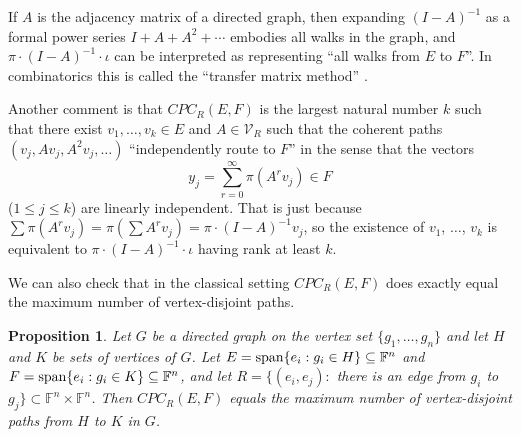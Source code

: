 \documentclass{amsart}
\newtheorem{prop}[thm]{Proposition}
\theoremstyle{definition}
\begin{document}
If $A$ is the adjacency matrix of a directed graph, then expanding $(I - A)^{-1}$ as a formal power series $I + A + A^2 + \cdots$ embodies all walks in the graph, and $\pi\cdot(I - A)^{-1}\cdot \iota$ can be interpreted as representing ``all walks from $E$ to $F$''. In combinatorics this is called the ``transfer matrix method'' \cite{stanley}.

Another comment is that $CPC_R(E,F)$ is the largest natural number $k$ such that there exist $v_1, \ldots, v_k \in E$ and $A \in \mathcal{V}_R$ such that the coherent paths $(v_j, Av_j, A^2 v_j, \ldots)$ ``independently route to $F$'' in the sense that the vectors $$y_j = \sum_{r = 0}^\infty \pi(A^r v_j) \in F$$ ($1 \leq j \leq k$) are linearly independent. That is just because $\sum \pi(A^r v_j) = \pi(\sum A^r v_j) = \pi\cdot(I - A)^{-1}v_j$, so the existence of $v_1$, $\ldots$, $v_k$ is equivalent to $\pi\cdot (I - A)^{-1}\cdot \iota$ having rank at least $k$.

We can also check that in the classical setting $CPC_R(E,F)$ does exactly equal the maximum number of vertex-disjoint paths.

\begin{prop}\label{gprop}
Let $G$ be a directed graph on the vertex set $\{g_1, \ldots, g_n\}$ and let $H$ and $K$ be sets of vertices of $G$. Let $E = {\rm span}\{e_i: g_i \in H\} \subseteq \mathbb{F}^n$ and $F = {\rm span}\{e_i: g_i \in K\} \subseteq \mathbb{F}^n$, and let $R = \{(e_i, e_j):$ there is an edge from $g_i$ to $g_j\} \subset \mathbb{F}^n\times \mathbb{F}^n$. Then $CPC_R(E, F)$ equals the maximum number of vertex-disjoint paths from $H$ to $K$ in $G$.
\end{prop}
\end{document}
